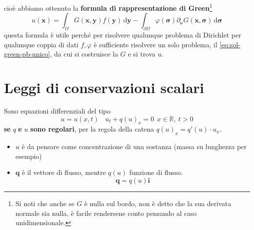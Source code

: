 \documentclass[10pt,a4paper,twoside,openright]{book}
\newcommand{\x}{\mathbf{x}}
\newcommand{\y}{\mathbf{y}}
\newcommand{\sigg}{\bm{\sigma}}
\newcommand{\nuu}{\bm{\nu}}
\newcommand{\de}{\,\mathrm d}
\newcommand{\dyy}{\de \y}
\newcommand{\dsig}{\de \sigg}
\begin{document}
cioè abbiamo ottenuto la \textbf{formula di rappresentazione di Green}\footnote{Si noti che anche se $G$ è nulla sul bordo, non è detto che la sua derivata normale sia nulla, è facile rendersene conto pensando al caso unidimensionale.}
\begin{equation*}
    \boxed{u(\x) =\int _{\Omega } G(\x,\y) f(\y) \dyy-\int _{\partial \Omega } \varphi (\sigg) \partial_{\nuu} G(\x,\sigg) \dsig }
\end{equation*}
questa formula è utile perché per risolvere qualunque problema di Dirichlet per qualunque coppia di dati $f,\varphi $ è sufficiente risolvere un solo problema, il \eqref{eq:sol-green-pb-unico}, da cui si costruisce la $G$ e si trova $u$.
\chapter{Leggi di conservazioni scalari}

Sono equazioni differenziali del tipo
\begin{equation}
    u=u(x,t) \ \ \ \ \boxed{u_{t} +q(u)_{x} =0}\ \ x\in \mathbb{R} ,\ t >0
\end{equation}
\textbf{se }$q$\textbf{ e }$u$\textbf{ sono regolari}, per la regola della catena $q(u)_{x} =q'(u) \cdotp u_{x}$.
\begin{itemize}
    \item $u$ è da pensare come concentrazione di una sostanza (massa su lunghezza per esempio)
    \item $\mathbf{q}$ è il vettore di flusso, mentre $q(u)$ funzione di flusso.
          \begin{equation}
              \mathbf{q} =q(u)\mathbf{i}
          \end{equation}
\end{itemize}
\end{document}
